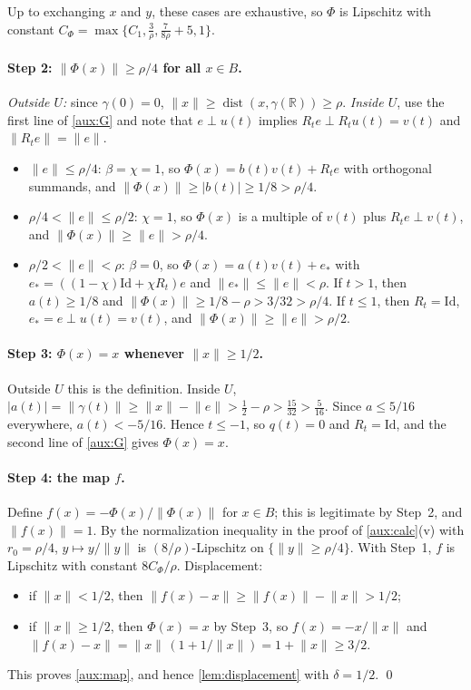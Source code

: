 \documentclass[11pt]{article}
\newcommand{\R}{\mathbb R}
\newcommand{\norm}[1]{\lVert #1\rVert}
\DeclareMathOperator{\dist}{dist}
\theoremstyle{definition}
\numberwithin{equation}{section}
\begin{document}
Up to exchanging \(x\) and \(y\), these cases are exhaustive, so \(\Phi\) is
Lipschitz with constant
\(C_\Phi=\max\{C_1,\frac3\rho,\frac7{8\rho}+5,1\}\).

\paragraph{Step 2: \(\norm{\Phi(x)}\ge\rho/4\) for all \(x\in B\).}
\emph{Outside \(U\):} since \(\gamma(0)=0\),
\(\norm x\ge\dist(x,\gamma(\R))\ge\rho\). \emph{Inside \(U\)}, use the first
line of \eqref{aux:G} and note that \(e\perp u(t)\) implies
\(R_te\perp R_tu(t)=v(t)\) and \(\norm{R_te}=\norm e\).
\begin{itemize}
\item \(\norm e\le\rho/4\): \(\beta=\chi=1\), so
\(\Phi(x)=b(t)v(t)+R_te\) with orthogonal summands, and
\(\norm{\Phi(x)}\ge|b(t)|\ge1/8>\rho/4\).
\item \(\rho/4<\norm e\le\rho/2\): \(\chi=1\), so \(\Phi(x)\) is a multiple
of \(v(t)\) plus \(R_te\perp v(t)\), and
\(\norm{\Phi(x)}\ge\norm e>\rho/4\).
\item \(\rho/2<\norm e<\rho\): \(\beta=0\), so
\(\Phi(x)=a(t)v(t)+e_*\) with
\(e_*=((1-\chi)\mathrm{Id}+\chi R_t)e\) and \(\norm{e_*}\le\norm e<\rho\). If
\(t>1\), then \(a(t)\ge1/8\) and
\(\norm{\Phi(x)}\ge1/8-\rho>3/32>\rho/4\). If \(t\le1\), then
\(R_t=\mathrm{Id}\), \(e_*=e\perp u(t)=v(t)\), and
\(\norm{\Phi(x)}\ge\norm e>\rho/2\).
\end{itemize}

\paragraph{Step 3: \(\Phi(x)=x\) whenever \(\norm x\ge1/2\).}
Outside \(U\) this is the definition. Inside \(U\),
\(|a(t)|=\norm{\gamma(t)}\ge\norm x-\norm e>\frac12-\rho>\frac{15}{32}
>\frac5{16}\). Since \(a\le5/16\) everywhere, \(a(t)<-5/16\). Hence
\(t\le-1\), so \(q(t)=0\) and \(R_t=\mathrm{Id}\), and the second line of
\eqref{aux:G} gives \(\Phi(x)=x\).

\paragraph{Step 4: the map \(f\).}
Define \(f(x)=-\Phi(x)/\norm{\Phi(x)}\) for \(x\in B\); this is legitimate by
Step~2, and \(\norm{f(x)}=1\). By the normalization inequality in the proof
of \cref{aux:calc}(v) with \(r_0=\rho/4\), \(y\mapsto y/\norm y\) is
\((8/\rho)\)-Lipschitz on \(\{\norm y\ge\rho/4\}\). With Step~1, \(f\) is
Lipschitz with constant \(8C_\Phi/\rho\). Displacement:
\begin{itemize}
\item if \(\norm x<1/2\), then
\(\norm{f(x)-x}\ge\norm{f(x)}-\norm x>1/2\);
\item if \(\norm x\ge1/2\), then \(\Phi(x)=x\) by Step~3, so
\(f(x)=-x/\norm x\) and
\(\norm{f(x)-x}=\norm x\,(1+1/\norm x)=1+\norm x\ge3/2\).
\end{itemize}
This proves \cref{aux:map}, and hence \cref{lem:displacement} with
\(\delta=1/2\). \qed
\end{document}
